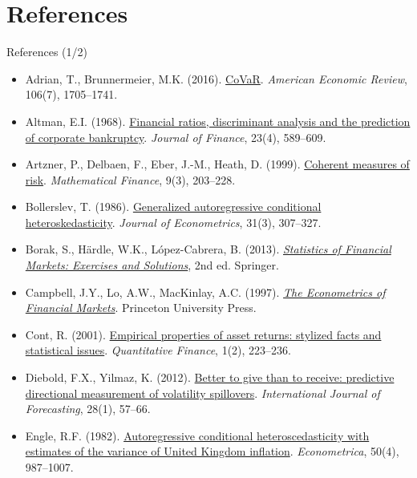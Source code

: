 \section{References}

\begin{frame}{References (1/2)}
\itemsize{\tiny}
\begin{itemize}
    \item Adrian, T., Brunnermeier, M.K. (2016). \href{https://doi.org/10.1257/aer.20120555}{CoVaR}. \textit{American Economic Review}, 106(7), 1705--1741.
    \item Altman, E.I. (1968). \href{https://doi.org/10.1111/j.1540-6261.1968.tb00843.x}{Financial ratios, discriminant analysis and the prediction of corporate bankruptcy}. \textit{Journal of Finance}, 23(4), 589--609.
    \item Artzner, P., Delbaen, F., Eber, J.-M., Heath, D. (1999). \href{https://doi.org/10.1111/1467-9965.00068}{Coherent measures of risk}. \textit{Mathematical Finance}, 9(3), 203--228.
    \item Bollerslev, T. (1986). \href{https://doi.org/10.1016/0304-4076(86)90063-1}{Generalized autoregressive conditional heteroskedasticity}. \textit{Journal of Econometrics}, 31(3), 307--327.
    \item Borak, S., Härdle, W.K., López-Cabrera, B. (2013). \href{https://doi.org/10.1007/978-3-642-33929-5}{\textit{Statistics of Financial Markets: Exercises and Solutions}}, 2nd ed. Springer.
    \item Campbell, J.Y., Lo, A.W., MacKinlay, A.C. (1997). \href{https://doi.org/10.1515/9781400830213}{\textit{The Econometrics of Financial Markets}}. Princeton University Press.
    \item Cont, R. (2001). \href{https://doi.org/10.1080/713665670}{Empirical properties of asset returns: stylized facts and statistical issues}. \textit{Quantitative Finance}, 1(2), 223--236.
    \item Diebold, F.X., Yilmaz, K. (2012). \href{https://doi.org/10.1016/j.ijforecast.2011.02.006}{Better to give than to receive: predictive directional measurement of volatility spillovers}. \textit{International Journal of Forecasting}, 28(1), 57--66.
    \item Engle, R.F. (1982). \href{https://doi.org/10.2307/1912773}{Autoregressive conditional heteroscedasticity with estimates of the variance of United Kingdom inflation}. \textit{Econometrica}, 50(4), 987--1007.

\end{itemize}
\end{frame}

